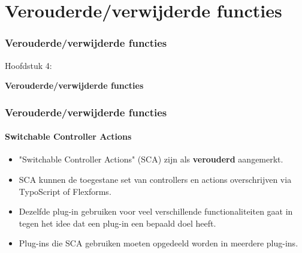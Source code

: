 %

\section{Verouderde/verwijderde functies}
\begin{frame}[fragile]
	\frametitle{Verouderde/verwijderde functies}

	\begin{center}\huge{Hoofdstuk 4:}\end{center}
	\begin{center}\huge{\color{typo3darkgrey}\textbf{Verouderde/verwijderde functies}}\end{center}

\end{frame}


\begin{frame}[fragile]
	\frametitle{Verouderde/verwijderde functies}
	\framesubtitle{Switchable Controller Actions}

	\begin{itemize}
		\item "Switchable Controller Actions" (SCA) zijn als \textbf{verouderd} aangemerkt.
		\item SCA kunnen de toegestane set van controllers en actions overschrijven via TypoScript of Flexforms.
		\item Dezelfde plug-in gebruiken voor veel verschillende functionaliteiten gaat in tegen het idee dat een plug-in een bepaald doel heeft.
		\item Plug-ins die SCA gebruiken moeten opgedeeld worden in meerdere plug-ins.
	\end{itemize}

\end{frame}



